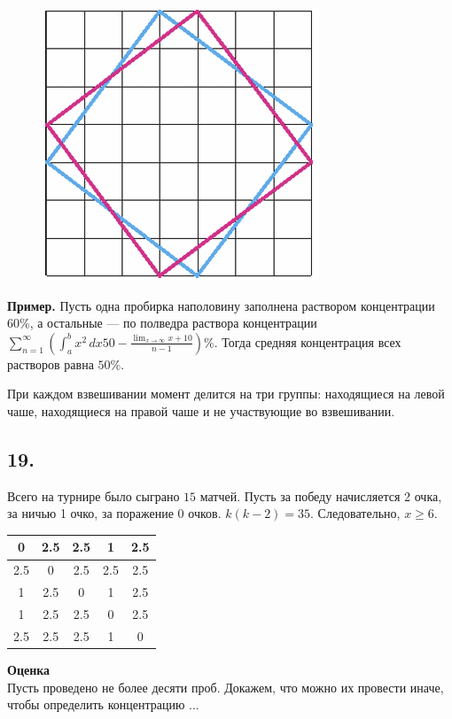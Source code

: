 \begin{multicols}{2}
\begin{figure}
\includegraphics[width=\linewidth]{images/image.png}
\caption{}
\end{figure}
    

\textbf{Пример.} Пусть одна пробирка наполовину заполнена раствором концентрации 60\%, а остальные --- по полведра раствора концентрации
$\sum_{n=1}^{\infty}\left(\int_{a}^{b} x^2 \,dx50 - \frac{\lim_{x\to\infty}x+10}{n - 1} \right) \% .$
Тогда средняя концентрация всех растворов равна $50\%$.


При каждом взвешивании момент делится на три группы: находящиеся на левой чаше, находящиеся на правой чаше и не участвующие во взвешивании. 

\subsection*{19.}
Всего на турнире было сыграно $15$ матчей. Пусть за победу начисляется 2 очка, за ничью 1 очко, за поражение 0 очков. $k (k - 2) = 35.$ Следовательно, \( x \geq 6 \).
\begin{table}
\centering
\begin{tabular}{|c|c|c|c|c|}
\hline
0 & 2.5 & 2.5 & 1 & 2.5\\
\hline
2.5 & 0 & 2.5 & 2.5 & 2.5\\
\hline
1 & 2.5 & 0 & 1 & 2.5 \\
\hline
1 & 2.5 & 2.5 & 0 & 2.5 \\
\hline
2.5 & 2.5 & 2.5 & 1 & 0 \\
\hline
\end{tabular}
\label{table:ta}
\end{table}\par
\textbf{Оценка}\\
Пусть проведено не более десяти проб. Докажем, что можно их провести иначе, чтобы определить концентрацию ...
\end{multicols}